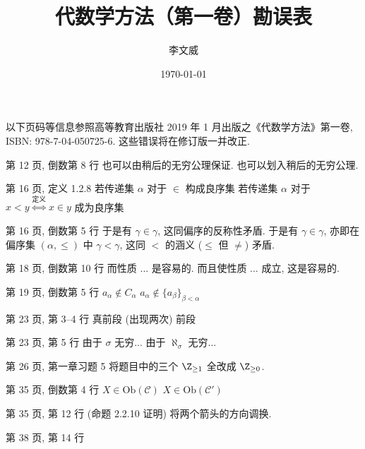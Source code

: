 \documentclass{AJerrata}
\title{\bfseries 代数学方法（第一卷）勘误表}
\author{李文威}
\date{\today}
\begin{document}
	\maketitle
	以下页码等信息参照高等教育出版社 2019 年 1 月出版之《代数学方法》第一卷, ISBN: 978-7-04-050725-6. 这些错误将在修订版一并改正.

	\begin{Errata}
		\item[第 12 页, 倒数第 8 行]
		\Orig 也可以由稍后的无穷公理保证.
		\Corr 也可以划入稍后的无穷公理.
		
		\item[第 16 页, 定义 1.2.8]
		\Orig 若传递集 $\alpha$ 对于 $\in$ 构成良序集
		\Corr 若传递集 $\alpha$ 对于 $x < y \stackrel{\text{定义}}{\iff} x \in y$ 成为良序集
		
		\item[第 16 页, 倒数第 5 行]
		\Orig 于是有 $\gamma \in \gamma$, 这同偏序的反称性矛盾.
		\Corr 于是有 $\gamma \in \gamma$, 亦即在偏序集 $(\alpha, \leq)$ 中 $\gamma < \gamma$, 这同 $<$ 的涵义 ($\leq$ 但 $\neq$) 矛盾.
		
		\item[第 18 页, 倒数第 10 行]
		\Orig 而性质 ... 是容易的.
		\Corr 而且使性质 ... 成立, 这是容易的.
		
        \item[第 19 页, 倒数第 5 行]
        \Orig $a_\alpha \notin C_\alpha$
        \Corr $a_\alpha \notin \{ a_\beta \}_{\beta < \alpha}$

		\item[第 23 页, 第 3--4 行]
		\Orig 真前段 (出现两次)
		\Corr 前段

		\item[第 23 页, 第 5 行]
		\Orig 由于 $\sigma$ 无穷...
		\Corr 由于 $\aleph_\sigma$ 无穷...

		\item[第 26 页, 第一章习题 5]
		将题目中的三个 $\Z_{\geq 1}$ 全改成 $\Z_{\geq 0}$.

        \item[第 35 页, 倒数第 4 行]
        \Orig $X \in \mathrm{Ob}(\mathcal{C})$
        \Corr $X \in \mathrm{Ob}(\mathcal{C}')$

        \item[第 35 页, 第 12 行 (命题 2.2.10 证明)]
        将两个箭头的方向调换.

		\item[第 38 页, 第 14 行]
		

\end{Errata}
\end{document}

